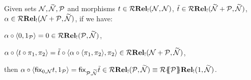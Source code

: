 \begin{lemma}\label{lemma:fixpoint}
Given sets $\mathcal{N},\widetilde{\mathcal{N}},\mathcal{P}$ and morphisms
$t\in \mathcal{R}\mathbf{Rel_!}(\mathcal{N}, \mathcal{N})$,
$\tilde t\in \mathcal{R}\mathbf{Rel_!}(\widetilde{\mathcal{N}}+\mathcal{P}, \widetilde{\mathcal{N}})$,
$\alpha\in \mathcal{R}\mathbf{Rel_!}(\mathcal{N}+\mathcal{P}, \widetilde{\mathcal{N}})$,
if we have:
\begin{varenumerate}
\item $\alpha\circ \langle 0,1_{\mathcal{P}} \rangle=0\in \mathcal{R}\mathbf{Rel_!}(\mathcal{P}, \widetilde{\mathcal{N}})$, 
\item $\alpha\circ \langle t\circ \pi_1,\pi_2  \rangle=
\tilde t\circ \langle \alpha\circ \langle \pi_1,\pi_2 \rangle,\pi_2\rangle\in \mathcal{R}\mathbf{Rel_!}(\mathcal{N}+\mathcal{P}, \widetilde{\mathcal{N}})
$,
\end{varenumerate} 
then
$\alpha\circ \langle {\mathsf{fix}}_{0,\mathcal{N}} t,1_{\mathcal{P}}\rangle={\mathsf{fix}}_{\mathcal{P},\widetilde{\mathcal{N}}} \tilde t\in \mathcal{R}\mathbf{Rel_!}(\mathcal{P}, \widetilde{\mathcal{N}})\equiv {\mathcal{R}}\{\!\!\{\mathcal{P}\}\!\!\}\mathbf{Rel_!}(1,\widetilde{\mathcal{N}})
$. 

\end{lemma}
%

